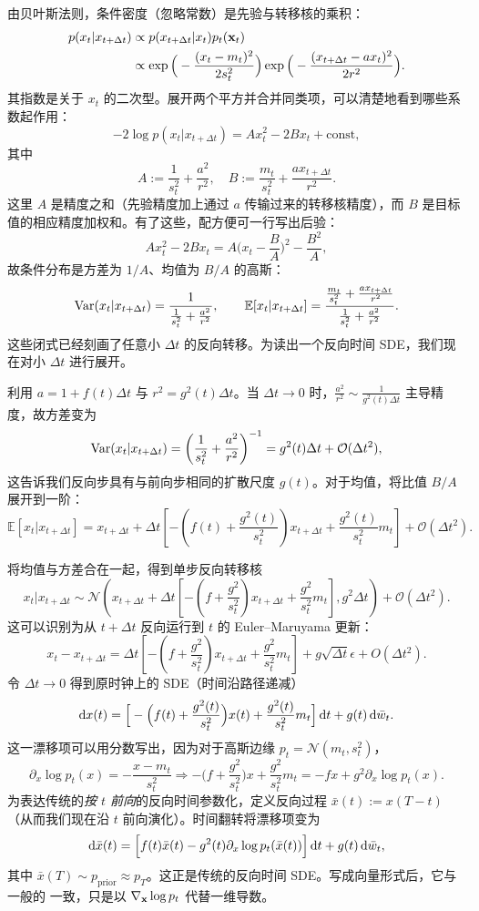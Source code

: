 由贝叶斯法则，条件密度（忽略常数）是先验与转移核的乘积：
\begin{align*}
    p(x_t   |   x_{t+\Delta t})  &\propto p(x_{t+\Delta t} | x_t   ) p_t({\mathbf{x}}_t) \\&\propto
\exp\Big(-\frac{(x_t-m_t)^2}{2s_t^2}\Big)  
\exp\Big(-\frac{(x_{t+\Delta t}-a  x_t)^2}{2r^2}\Big).
\end{align*}
其指数是关于 $x_t$ 的二次型。展开两个平方并合并同类项，可以清楚地看到哪些系数起作用：
\[
-2\log p(x_t   |   x_{t+\Delta t})
 = 
A  x_t^2  -  2 B  x_t  +  \text{const},
\]
其中
\[
A:=\frac{1}{s_t^2}+\frac{a^2}{r^2},\quad
B:=\frac{m_t}{s_t^2}+\frac{a  x_{t+\Delta t}}{r^2}.
\]
这里 $A$ 是精度之和（先验精度加上通过 $a$ 传输过来的转移核精度），而 $B$ 是目标值的相应精度加权和。有了这些，配方便可一行写出后验：
\[
A x_t^2 - 2 B x_t
  =  
A\Big(x_t-\frac{B}{A}\Big)^2  -  \frac{B^2}{A},
\]
故条件分布是方差为 $1/A$、均值为 $B/A$ 的高斯：
\[
\mathrm{Var}(x_t   |   x_{t+\Delta t})   =   \frac{1}{\frac{1}{s_t^2}+\frac{a^2}{r^2}},
\qquad
\mathbb E[x_t   |   x_{t+\Delta t}]   =  
\frac{\frac{m_t}{s_t^2}+\frac{a  x_{t+\Delta t}}{r^2}}{\frac{1}{s_t^2}+\frac{a^2}{r^2}}.
\]
这些闭式已经刻画了任意小 $\Delta t$ 的反向转移。为读出一个反向时间 SDE，我们现在对小 $\Delta t$ 进行展开。

利用 $a=1+f(t)\Delta t$ 与 $r^2=g^2(t)\Delta t$。当 $\Delta t\to 0$ 时，$\frac{a^2}{r^2}\sim \frac{1}{g^2(t)\Delta t}$ 主导精度，故方差变为
\[
\mathrm{Var}(x_t   |   x_{t+\Delta t})
= \left(\frac{1}{s_t^2}+\frac{a^2}{r^2}\right)^{-1}
= g^2(t)  \Delta t  +  \mathcal{O}(\Delta t^2),
\]
这告诉我们反向步具有与前向步相同的扩散尺度 $g(t)$。对于均值，将比值 $B/A$ 展开到一阶：
\[
\mathbb E[x_t   |   x_{t+\Delta t}]
  =  x_{t+\Delta t}
 +  \Delta t\left[
-\left(f(t)+\frac{g^2(t)}{s_t^2}\right)  x_{t+\Delta t}
 +  \frac{g^2(t)}{s_t^2}  m_t
\right]  +  \mathcal{O}(\Delta t^2).
\]

将均值与方差合在一起，得到单步反向转移核
\[
x_t    |    x_{t+\Delta t}
 \sim 
\mathcal N\!\left(
x_{t+\Delta t} + \Delta t\!\left[-\left(f+\frac{g^2}{s_t^2}\right)  x_{t+\Delta t} + \frac{g^2}{s_t^2}  m_t\right],
 g^2  \Delta t\right)
 +  \mathcal{O}(\Delta t^2).
\]
这可以识别为从 $t+\Delta t$ 反向运行到 $t$ 的 Euler–Maruyama 更新：
\[
x_t - x_{t+\Delta t}
= \Delta t\!\left[-\left(f+\frac{g^2}{s_t^2}\right) x_{t+\Delta t} + \frac{g^2}{s_t^2} m_t\right]
+ g\sqrt{\Delta t} \epsilon + O(\Delta t^2).
\]
令 $\Delta t\to 0$ 得到原时钟上的 SDE（时间沿路径递减）
\[
\mathop{}\!\mathrm{d} x(t)
= \Big[-\Big(f(t)+\frac{g^2(t)}{s_t^2}\Big) x(t) + \frac{g^2(t)}{s_t^2} m_t\Big]\mathop{}\!\mathrm{d} t
+ g(t) \mathop{}\!\mathrm{d} \bar w_t .
\]
这一漂移项可以用分数写出，因为对于高斯边缘 $p_t=\mathcal N(m_t,s_t^2)$，
\[
\partial_x \log p_t(x) = -\frac{x-m_t}{s_t^2}
 \Longrightarrow 
-\Big(f+\frac{g^2}{s_t^2}\Big) x + \frac{g^2}{s_t^2} m_t
= -f x + g^2 \partial_x\log p_t(x).
\]
为表达传统的\emph{按 $t$ 前向}的反向时间参数化，定义反向过程 $\bar x(t):=x(T-t)$（从而我们现在沿 $t$ 前向演化）。时间翻转将漂移项变为
\[
\mathop{}\!\mathrm{d} \bar x(t)
= \Big[ f(t) \bar x(t)  -  g^2(t) \partial_x \log p_t(\bar x(t)) \Big]\mathop{}\!\mathrm{d} t
+ g(t)\mathop{}\!\mathrm{d} \bar w_t,
\]
其中 $\bar x(T)\sim p_{\mathrm{prior}}\approx p_T$。这正是传统的反向时间 SDE。写成向量形式后，它与一般的  一致，只是以 $\nabla_{{\mathbf{x}}}\log p_t$ 代替一维导数。

